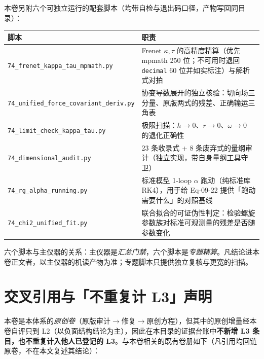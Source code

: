 \documentclass[UTF8,fontset=fandol,11pt]{ctexart}
\newcommand{\code}[1]{\texttt{#1}}
\begin{document}
本卷另附六个可独立运行的配套脚本（均带自检与退出码口径，产物写回同目录）：

\begin{center}
\begin{tabular}{p{6.4cm}p{7.4cm}}
\toprule
脚本 & 职责 \\
\midrule
\code{74\_frenet\_kappa\_tau\_mpmath.py} & Frenet $\kappa,\tau$ 的高精度精算（优先 mpmath 250 位；不可用时退回 \code{decimal} 60 位并如实标注）与解析式对拍 \\
\code{74\_unified\_force\_covariant\_deriv.py} & 协变导数展开的独立核验：切向场三分量、原版两式的残差、正确输运三角表 \\
\code{74\_limit\_check\_kappa\_tau.py} & 极限扫描：$h\to0$、$r\to0$、$\omega\to0$ 的退化正确性 \\
\code{74\_dimensional\_audit.py} & 23 条收录式 + 8 条废弃式的量纲审计（独立实现，带自身量纲工具守卫） \\
\code{74\_rg\_alpha\_running.py} & 标准模型 1-loop $\alpha$ 跑动（纯标准库 RK4），用于给 Eq-09-22 提供「跑动需要什么」的对照基线 \\
\code{74\_chi2\_unified\_fit.py} & 联合拟合的可证伪性判定：检验螺旋参数族对标准可观测量的残差是否随参数变化 \\
\bottomrule
\end{tabular}
\end{center}

六个脚本与主仪器的关系：主仪器是\emph{汇总门禁}，六个脚本是\emph{专题精算}。凡结论进本卷正文者，以主仪器的机读产物为准；专题脚本只提供独立复核与更宽的扫描。

\section{交叉引用与「不重复计 L3」声明}
\label{sec:xref}

本卷是本体系的\emph{原创卷}（原版审计$\to$修复$\to$原创方程），但其中的原创增量经本卷自评只到 L2（以负面结构结论为主），因此在本目录的证据台账中\textbf{不新增 L3 条目，也不重复计入他人已登记的 L3}。与本卷相关的既有卷册如下（凡引用均回链原卷，不在本文复述其结论）：
\end{document}
